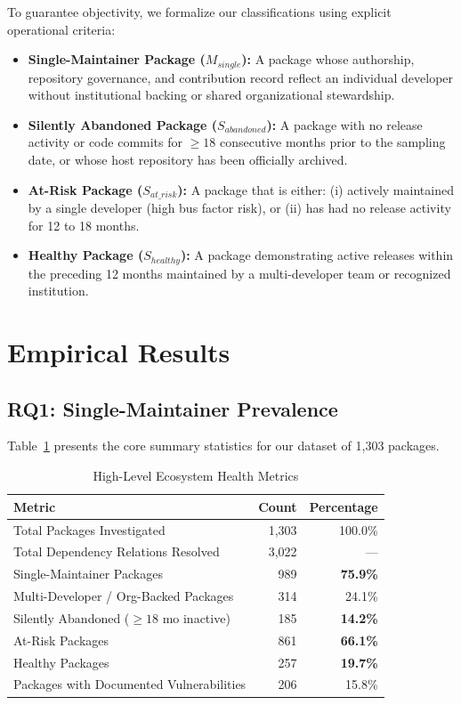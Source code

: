 \documentclass[conference]{IEEEtran}
\begin{document}
To guarantee objectivity, we formalize our classifications using explicit operational criteria:
\begin{itemize}
    \item \textbf{Single-Maintainer Package ($M_{single}$):} A package whose authorship, repository governance, and contribution record reflect an individual developer without institutional backing or shared organizational stewardship.
    \item \textbf{Silently Abandoned Package ($S_{abandoned}$):} A package with no release activity or code commits for $\ge 18$ consecutive months prior to the sampling date, or whose host repository has been officially archived.
    \item \textbf{At-Risk Package ($S_{at\_risk}$):} A package that is either: (i) actively maintained by a single developer (high bus factor risk), or (ii) has had no release activity for 12 to 18 months.
    \item \textbf{Healthy Package ($S_{healthy}$):} A package demonstrating active releases within the preceding 12 months maintained by a multi-developer team or recognized institution.
\end{itemize}

\section{Empirical Results}

\subsection{RQ1: Single-Maintainer Prevalence}

Table~\ref{tab:overview} presents the core summary statistics for our dataset of 1,303 packages.

\begin{table}[htbp]
\caption{High-Level Ecosystem Health Metrics}
\label{tab:overview}
\centering
\begin{tabular}{lrr}
\toprule
\textbf{Metric} & \textbf{Count} & \textbf{Percentage} \\
\midrule
Total Packages Investigated & 1,303 & 100.0\% \\
Total Dependency Relations Resolved & 3,022 & --- \\
Single-Maintainer Packages & 989 & \textbf{75.9\%} \\
Multi-Developer / Org-Backed Packages & 314 & 24.1\% \\
Silently Abandoned ($\ge 18$ mo inactive) & 185 & \textbf{14.2\%} \\
At-Risk Packages & 861 & \textbf{66.1\%} \\
Healthy Packages & 257 & \textbf{19.7\%} \\
Packages with Documented Vulnerabilities & 206 & 15.8\% \\
\bottomrule
\end{tabular}
\end{table}
\end{document}

